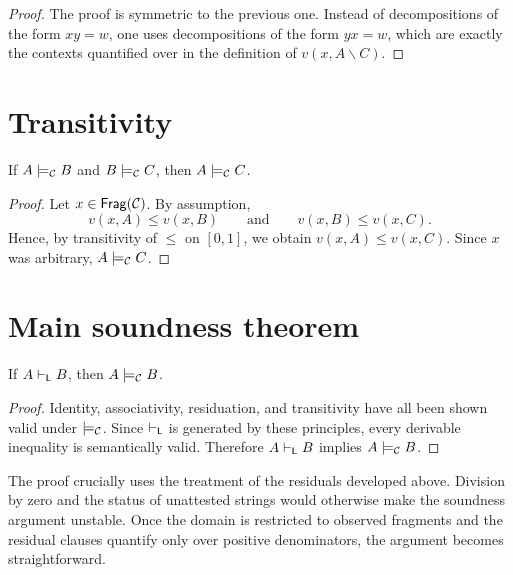 \begin{proof}
The proof is symmetric to the previous one. Instead of decompositions of the form $xy=w$, one
uses decompositions of the form $yx=w$, which are exactly the contexts quantified over in the
definition of $v(x,A\backslash C)$.
\end{proof}


\section{Transitivity}
\begin{theorem}[Transitivity]
If $A \models_{\mathcal C} B$ and $B \models_{\mathcal C} C$, then $A \models_{\mathcal C} C$.
\end{theorem}

\begin{proof}
Let $x \in \mathsf{Frag}(\mathcal C)$. By assumption,
\[
v(x,A) \leq v(x,B)
\qquad\text{and}\qquad
v(x,B) \leq v(x,C).
\]
Hence, by transitivity of $\leq$ on $[0,1]$, we obtain $v(x,A) \leq v(x,C)$. Since $x$ was
arbitrary, $A \models_{\mathcal C} C$.
\end{proof}


\section{Main soundness theorem}
\begin{theorem}[Soundness]
If $A \vdash_{\mathsf{L}} B$, then $A \models_{\mathcal C} B$.
\end{theorem}

\begin{proof}
Identity, associativity, residuation, and transitivity have all been shown valid under $\models_{\mathcal C}$.
Since $\vdash_{\mathsf{L}}$ is generated by these principles, every derivable inequality is semantically
valid. Therefore $A \vdash_{\mathsf{L}} B$ implies $A \models_{\mathcal C} B$.
\end{proof}

\begin{remark}
The proof crucially uses the treatment of the residuals developed above. Division by zero and the
status of unattested strings would otherwise make the soundness argument unstable. Once the domain
is restricted to observed fragments and the residual clauses quantify only over positive
denominators, the argument becomes straightforward.
\end{remark}
